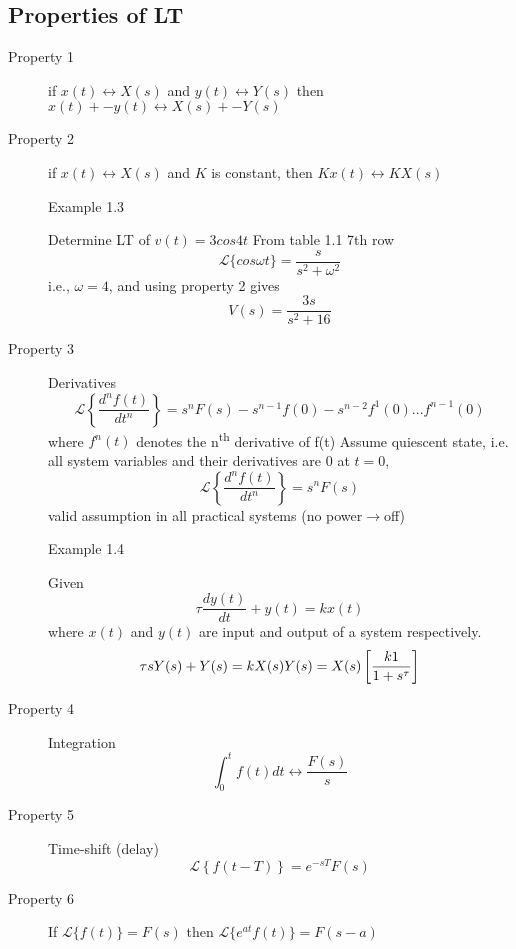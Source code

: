 \documentclass[11pt]{article} %
\begin{document}
\subsection{Properties of LT}
	\begin{description}
		\item[Property 1] if $x(t)\leftrightarrow X(s)$ and $y(t)\leftrightarrow Y(s)$ then $x(t)+-y(t) \leftrightarrow X(s)+- Y(s)$
		\item[Property 2] if $x(t)\leftrightarrow X(s)$  and $K$ is constant, then $Kx(t)\leftrightarrow KX(s)$

		Example 1.3 

		Determine LT of $v(t) = 3cos4t$
		From table 1.1 7th row
			\begin{equation}
				\mathcal{L}\{cos\omega t\} = \frac{s}{s^2+\omega^2}
			\end{equation}
		i.e., $\omega=4$, and using property 2 gives
			\begin{equation}
				 V(s) =  \frac{3s}{s^2+16}
			\end{equation}
		\item[Property 3] Derivatives
			\begin{equation}
				\mathcal{L}\left\{\frac{d^nf(t)}{dt^n}\right\} = s^n  F(s) -s^{n-1}f(0)-s^{n-2}f^1(0)  ...  f^{n-1}(0)
			\end{equation}
			where $f^n(t)$ denotes the n\textsuperscript{th} derivative of f(t)
		Assume quiescent state, i.e. all system variables and their derivatives are 0 at $t=0$,
			\begin{equation}
				\mathcal{L}\left\{\frac{d^nf(t)}{dt^n}\right\}  = s^nF(s)
			\end{equation}
		valid assumption in all practical systems (no power$\rightarrow$off)

		Example 1.4
			
			Given $$\tau \frac{dy(t)}{dt}+y(t) = kx(t)$$  where $x(t)$ and $y(t)$ are input and output of a system respectively.
			\begin{equation}
				\tau s Y(s) + Y(s) = kX(s) \\
				Y(s) = X(s)\left[\frac{k1}{1+s^\tau }\right]
			\end{equation}

		\item[Property 4] Integration
			\begin{equation}
				\int^t_0f(t)dt\leftrightarrow \frac{F(s)}{s}
			\end{equation}

		\item[Property 5] Time-shift (delay)
			\begin{equation}
				\mathcal{L}\left\{f(t-T)\right\}=e^{-sT}F(s)
			\end{equation}
		\item[Property 6]
			If $\mathcal{L}\{f(t)\}=F(s)$
			then $\mathcal{L}\{e^{at}f(t)\} = F(s-a)$
	\end{description}
\end{document}
